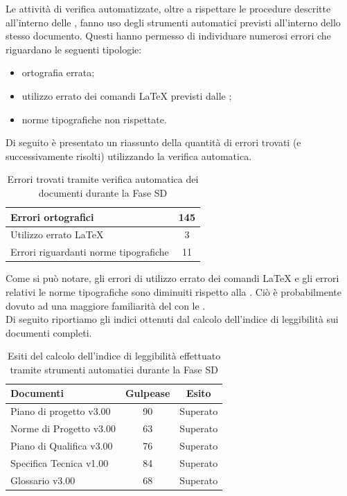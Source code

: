 			Le attività di verifica automatizzate, oltre a rispettare le procedure descritte all'interno delle , fanno uso degli strumenti automatici previsti all'interno dello stesso documento. Questi hanno permesso di individuare numerosi errori che riguardano le seguenti tipologie:
			\begin{itemize}
				\item ortografia errata;
				\item utilizzo errato dei comandi \LaTeX{} previsti dalle ;
				\item norme tipografiche non rispettate.
			\end{itemize}
			Di seguito è presentato un riassunto della quantità di errori trovati (e successivamente risolti) utilizzando la verifica automatica.
			\begin{table}[H]
					\centering
					\begin{tabu}{| l | c |}
						\hline
						Errori ortografici	&145	\\ \hline
						Utilizzo errato \LaTeX{}	&3	\\ \hline
						Errori riguardanti norme tipografiche	&11	\\ \hline
					\end{tabu}
					\caption{Errori trovati tramite verifica automatica dei documenti durante la Fase SD}
				\end{table}
				Come si può notare, gli errori di utilizzo errato dei comandi \LaTeX{} e gli errori relativi le norme tipografiche sono diminuiti rispetto alla . Ciò è probabilmente dovuto ad una maggiore familiarità del  con le \insdoc{Norme di Progetto v3.00}.\\
				Di seguito riportiamo gli indici ottenuti dal calcolo dell'indice di leggibilità sui documenti completi.
				\begin{table}[H]
					\centering
					\begin{tabu}{| l | c | c |}
							\hline
							Documenti 							& Gulpease	& Esito		\\ \hline \hline
							
							Piano di progetto v3.00				& 90 		& Superato  \\ \hline
							Norme di Progetto v3.00 			& 63		& Superato  \\ \hline
							Piano di Qualifica v3.00 			& 76		& Superato  \\ \hline
							Specifica Tecnica v1.00 			& 84		& Superato  \\ \hline
							Glossario v3.00					 	& 68 		& Superato  \\ \hline
						\end{tabu}
					\caption{Esiti del calcolo dell'indice di leggibilità effettuato tramite strumenti automatici durante la Fase SD}
				\end{table}
